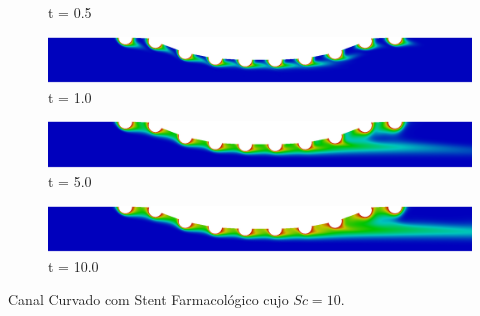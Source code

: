 \begin{frame}
\begin{figure}
\begin{minipage}{.50\linewidth}
      \scriptsize t = 0.5
     \end{minipage}%
     \begin{minipage}{.50\linewidth}
      \centering
      \includegraphics[scale=0.08]{images/conc10_CurvedStrut5000.png}\\
      \scriptsize t = 1.0
     \end{minipage}
     \begin{minipage}{.50\linewidth}
     \medskip
      \centering
      \includegraphics[scale=0.08]{images/conc10_CurvedStrut25000.png}\\
      \scriptsize t = 5.0
     \end{minipage}%
     \begin{minipage}{.50\linewidth}
     \medskip
      \centering
      \includegraphics[scale=0.08]{images/conc10_CurvedStrut50000.png}\\
      \scriptsize t = 10.0
     \end{minipage}
\end{figure}
\vspace{0cm}
\centering \scriptsize Canal Curvado com Stent Farmacológico cujo $Sc=10$.
\end{frame}


